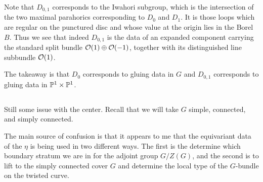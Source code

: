 \documentclass[12pt]{article}
\begin{document}
Note that $D_{0,1}$ corresponds to the Iwahori subgroup, which is the intersection of the two maximal parahorics corresponding to $D_0$ and $D_1$. It is those loops which are regular on the punctured disc and whose value at the origin lies in the Borel $B$. Thus we see that indeed $D_{0,1}$ is the data of an expanded component carrying the standard split bundle \(\cO(1)\oplus \cO(-1)\), together with its distinguished line subbundle \(\cO(1)\).

The takeaway is that $D_0$ corresponds to gluing data in $G$ and $D_{0,1}$ corresponds to gluing data in $\P^1 \times \P^1$.

\subsection{}
Still some issue with the center. Recall that we will take $G$ simple, connected, and simply connected.

The main source of confusion is that it appears to me that the equivariant data of the $\eta$ is being used in two different ways. The first is the determine which boundary stratum we are in for the adjoint group $G/Z(G)$, and the second is to lift to the simply connected cover $G$ and determine the local type of the $G$-bundle on the twisted curve. 
\end{document}

